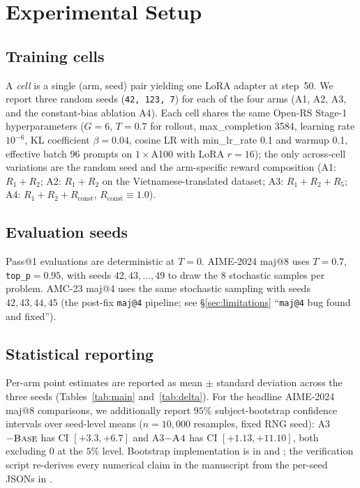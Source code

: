 \documentclass[journal,onecolumn,11pt]{IEEEtran}
\newcommand{\armA}{\textsc{A1}}
\newcommand{\armB}{\textsc{A2}}
\newcommand{\armC}{\textsc{A3}}
\newcommand{\armD}{\textsc{A4}}
\newcommand{\base}{\textsc{Base}}
\begin{document}
\section{Experimental Setup}
\label{sec:setup}

\subsection{Training cells}
A \emph{cell} is a single (arm, seed) pair yielding one LoRA adapter at
step~50. We report three random seeds (\texttt{42, 123, 7}) for each of
the four arms (\armA{}, \armB{}, \armC{}, and the constant-bias ablation
\armD{}). Each cell shares the same Open-RS Stage-1 hyperparameters
($G{=}6$, $T{=}0.7$ for rollout, max\_completion 3584, learning rate
$10^{-6}$, KL coefficient $\beta{=}0.04$, cosine LR with min\_lr\_rate
0.1 and warmup 0.1, effective batch 96 prompts on $1\times$A100 with LoRA
$r{=}16$); the only across-cell variations are the random seed and the
arm-specific reward composition (\armA{}: $R_1{+}R_2$; \armB{}: $R_1{+}R_2$
on the Vietnamese-translated dataset; \armC{}: $R_1{+}R_2{+}R_5$;
\armD{}: $R_1{+}R_2{+}R_{\text{const}}$, $R_{\text{const}}{\equiv}1.0$).

\subsection{Evaluation seeds}
Pass@1 evaluations are deterministic at $T{=}0$. AIME-2024 maj@8 uses
$T{=}0.7$, \texttt{top\_p}$=0.95$, with seeds $42,43,\ldots,49$ to draw the
8 stochastic samples per problem. AMC-23 maj@4 uses the same stochastic
sampling with seeds $42,43,44,45$ (the post-fix \texttt{maj@4} pipeline; see
\S\ref{sec:limitations} ``\texttt{maj@4} bug found and fixed'').

\subsection{Statistical reporting}
Per-arm point estimates are reported as mean $\pm$ standard deviation
across the three seeds (Tables~\ref{tab:main} and~\ref{tab:delta}).
For the headline AIME-2024 maj@8 comparisons, we additionally report
$95\%$ subject-bootstrap confidence intervals over seed-level means
($n{=}10{,}000$ resamples, fixed RNG seed): \armC{}$-\base{}$ has
CI $[+3.3, +6.7]$ and \armC{}$-\armD{}$ has CI $[+1.13, +11.10]$, both
excluding $0$ at the $5\%$ level. Bootstrap implementation is in
 and ;
the verification script re-derives every numerical claim in the manuscript
from the per-seed JSONs in .
\end{document}
